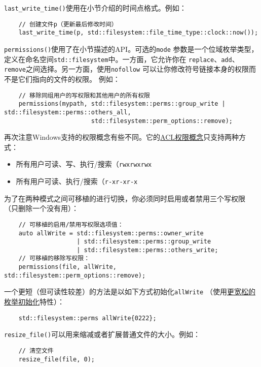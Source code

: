 \texttt{last\_write\_time()}使用在小节介绍的时间点格式。例如：
\begin{lstlisting}
    // 创建文件p（更新最后修改时间）
    last_write_time(p, std::filesystem::file_time_type::clock::now());
\end{lstlisting}

\texttt{permissions()}使用了在小节描述的API。可选的\texttt{mode}
参数是一个位域枚举类型，定义在命名空间\texttt{std::filesystem}中。一方面，它允许你在
\texttt{replace}、\texttt{add}、\texttt{remove}之间选择。另一方面，使用\texttt{nofollow}
可以让你修改符号链接本身的权限而不是它们指向的文件的权限。
例如：
\begin{lstlisting}
    // 移除同组用户的写权限和其他用户的所有权限
    permissions(mypath, std::filesystem::perms::group_write | std::filesystem::perms::others_all,
                        std::filesystem::perm_options::remove);
\end{lstlisting}
再次注意Windows支持的权限概念有些不同。它的\hyperref[ACL]{ACL权限概念}只支持两种方式：\label{可移植的修改权限}
\begin{itemize}
    \item 所有用户可读、写、执行/搜索（\texttt{rwxrwxrwx}
    \item 所有用户可读、执行/搜索（\texttt{r-xr-xr-x}
\end{itemize}
为了在两种模式之间可移植的进行切换，你必须同时启用或者禁用三个写权限
（只删除一个没有用）：
\begin{lstlisting}
    // 可移植的启用/禁用写权限选项值：
    auto allWrite = std::filesystem::perms::owner_write
                    | std::filesystem::perms::group_write
                    | std::filesystem::perms::others_write;
    // 可移植的移除写权限：
    permissions(file, allWrite, std::filesystem::perm_options::remove);
\end{lstlisting}
一个更短（但可读性较差）的方法是以如下方式初始化\texttt{allWrite}
（使用\hyperref[ch8.3]{更宽松的枚举初始化}特性）：
\begin{lstlisting}
    std::filesystem::perms allWrite{0222};
\end{lstlisting}
\texttt{resize\_file()}可以用来缩减或者扩展普通文件的大小。例如：
\begin{lstlisting}
    // 清空文件
    resize_file(file, 0);
\end{lstlisting}

